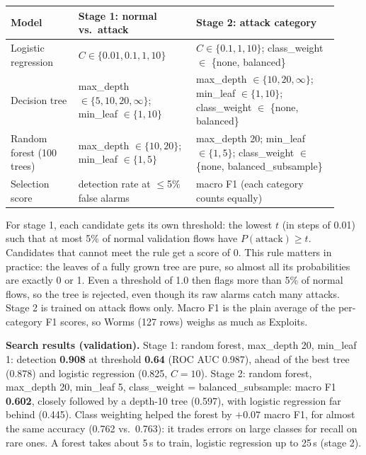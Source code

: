 \documentclass[11pt,a4paper]{article}
\begin{document}
\begin{center}\small
\begin{tabular}{>{\raggedright\arraybackslash}p{0.19\linewidth}>{\raggedright\arraybackslash}p{0.33\linewidth}>{\raggedright\arraybackslash}p{0.4\linewidth}}
\toprule
Model & Stage 1: normal vs.\ attack & Stage 2: attack category \\
\midrule
Logistic regression & $C \in \{0.01, 0.1, 1, 10\}$ & $C \in \{0.1, 1, 10\}$; class\_weight $\in$ \{none, balanced\} \\
Decision tree & max\_depth $\in \{5,10,20,\infty\}$; min\_leaf $\in\{1,10\}$ & max\_depth $\in\{10,20,\infty\}$; min\_leaf $\in\{1,10\}$; class\_weight $\in$ \{none, balanced\} \\
Random forest (100 trees) & max\_depth $\in\{10,20\}$; min\_leaf $\in\{1,5\}$ & max\_depth 20; min\_leaf $\in\{1,5\}$; class\_weight $\in$ \{none, balanced\_subsample\} \\
\midrule
Selection score & detection rate at $\le$5\% false alarms & macro F1 (each category counts equally) \\
\bottomrule
\end{tabular}
\end{center}

For stage 1, each candidate gets its own threshold: the lowest $t$ (in steps of 0.01) such that at
most 5\% of normal validation flows have $P(\text{attack}) \ge t$. Candidates that cannot meet the
rule get a score of 0. This rule matters in practice: the leaves of a fully grown tree are pure, so
almost all its probabilities are exactly 0 or 1. Even a threshold of 1.0 then flags more than 5\% of
normal flows, so the tree is rejected, even though its raw alarms catch many attacks. Stage 2 is trained on attack flows only. Macro F1
is the plain average of the per-category F1 scores, so Worms (127 rows) weighs as much as Exploits.

\textbf{Search results (validation).} Stage 1: random forest, max\_depth 20, min\_leaf 1:
detection \textbf{0.908} at threshold \textbf{0.64} (ROC AUC 0.987), ahead of the best tree (0.878)
and logistic regression (0.825, $C{=}10$). Stage 2: random forest, max\_depth 20, min\_leaf 5,
class\_weight = balanced\_subsample: macro F1 \textbf{0.602}, closely followed by a depth-10 tree
(0.597), with logistic regression far behind (0.445). Class weighting helped the forest by
$+0.07$ macro F1, for almost the same accuracy (0.762 vs.\ 0.763): it trades errors on large classes for
recall on rare ones. A forest takes about 5\,s to train, logistic regression up to 25\,s (stage 2).
\end{document}
